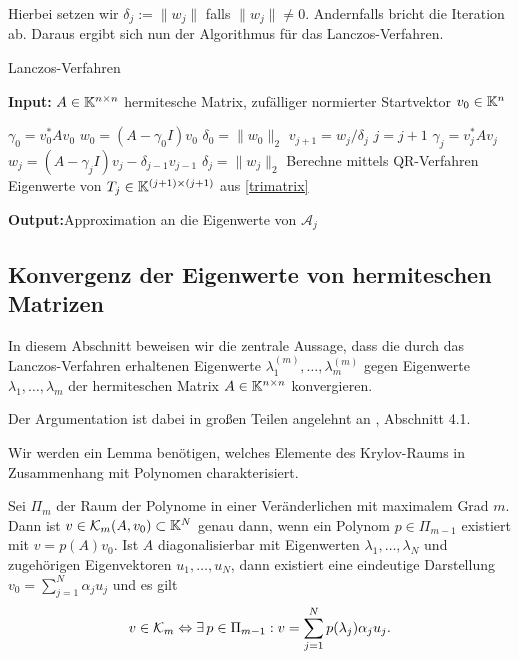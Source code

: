 \documentclass{article}
\begin{document}
Hierbei setzen wir $\delta_j := \|w_j\|$ falls $\|w_j\| \neq 0$. Andernfalls bricht die Iteration ab. Daraus ergibt sich nun der Algorithmus für das Lanczos-Verfahren.

\renewcommand{\algorithmicrequire}{\textbf{Input:}}
\renewcommand{\algorithmicensure}{\textbf{Output:}}

\begin{algorithm}
	\label{Lanczos-Verfahren}
	\caption{Lanczos-Verfahren}
	\algorithmicrequire{ $A \in \mathbb{K}^{n\times n}$ hermitesche Matrix, zufälliger normierter Startvektor $v_0 \in \mathbb{K}^n$}
	\begin{algorithmic}[1]
		\State $\gamma_0 = v_0^*Av_0$
		\State $w_0 = (A-\gamma_0 I)v_0$
	  \State $\delta_0 = \|w_0\|_2$
		\State $v_{j+1} = w_j/\delta_j$
		\State $j = j+1$
		\State $\gamma_j = v_j^*Av_j$
		\State $w_j = (A-\gamma_j I)v_j - \delta_{j-1}v_{j-1}$
		\State $\delta_j = \|w_j\|_2$
		\EndWhile
		\State Berechne mittels QR-Verfahren Eigenwerte von $T_j \in \mathbb{K}^{(j+1) \times (j+1)}$ aus \ref{trimatrix}
	\end{algorithmic}
	\algorithmicensure{Approximation an die Eigenwerte von $\mathcal{A}_j$}
\end{algorithm}


\subsection{Konvergenz der Eigenwerte von hermiteschen Matrizen}

In diesem Abschnitt beweisen wir die zentrale Aussage, dass die durch das Lanczos-Verfahren erhaltenen Eigenwerte $\lambda_1^{(m)},\dots,\lambda_m^{(m)}$ gegen Eigenwerte $\lambda_1,\dots,\lambda_m$ der hermiteschen Matrix $A \in \mathbb{K}^{n \times n}$ konvergieren.

Der Argumentation ist dabei in großen Teilen angelehnt an \cite{Eigenwertprobleme}, Abschnitt 4.1.

Wir werden ein Lemma benötigen, welches Elemente des Krylov-Raums in Zusammenhang mit Polynomen charakterisiert.

\begin{lemma}
	Sei $\Pi_m$ der Raum der Polynome in einer Veränderlichen mit maximalem Grad $m$. Dann ist $v \in \mathcal{K}_m(A,v_0) \subset \mathbb{K}^N$ genau dann, wenn ein Polynom $p \in \Pi_{m-1}$ existiert mit $v = p(A)v_0$. \newline
	Ist $A$ diagonalisierbar mit Eigenwerten $\lambda_1, \dots, \lambda_N$ und zugehörigen Eigenvektoren $u_1, \dots, u_N$, dann existiert eine eindeutige Darstellung $v_0 = \sum_{j=1}^{N} \alpha_j u_j$ und es gilt
	\begin{align*}
		v \in \mathcal{K}_m \Leftrightarrow \exists \, p \in \Pi_{m-1}: v = \sum_{j=1}^{N} p(\lambda_j)\alpha_j u_j.
	\end{align*}
\end{lemma}
\end{document}
